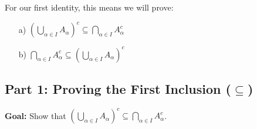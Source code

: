 \documentclass[11pt,a4paper]{article}
\begin{document}
For our first identity, this means we will prove:
\begin{itemize}
    \item[a)] $\left( \bigcup_{\alpha \in I} A_\alpha \right)^c \subseteq \bigcap_{\alpha \in I} A_\alpha^c$
    \item[b)] $\bigcap_{\alpha \in I} A_\alpha^c \subseteq \left( \bigcup_{\alpha \in I} A_\alpha \right)^c$
\end{itemize}

\subsection{Part 1: Proving the First Inclusion ($\subseteq$)}

\textbf{Goal:} Show that $\left( \bigcup_{\alpha \in I} A_\alpha \right)^c \subseteq \bigcap_{\alpha \in I} A_\alpha^c$.
\end{document}
